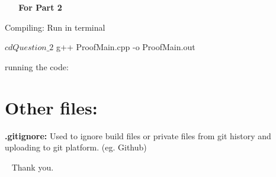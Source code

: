 ~\newline
~\newline
{\bfseries For Part 2}


\begin{DoxyEnumerate}
\item Compiling\+: Run in terminal~\newline
 
\begin{DoxyCode}
$ cd Question\_2
$ g++ ProofMain.cpp -o ProofMain.out
\end{DoxyCode}

\item running the code\+: 

\end{DoxyEnumerate}

\section*{Other files\+:}


\begin{DoxyEnumerate}
\item {\bfseries .gitignore\+: } Used to ignore build files or private files from git history and uploading to git platform. (eg. Github)
\end{DoxyEnumerate}

~\newline
 Thank you. 